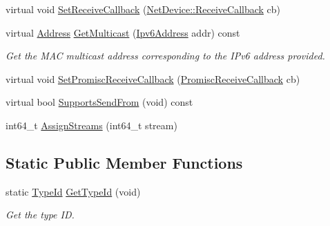 \begin{DoxyCompactItemize}
\item 
virtual void \hyperlink{classns3_1_1CsmaNetDevice_a7aece222e096a5526a28e7bf71e609f8}{Set\+Receive\+Callback} (\hyperlink{classns3_1_1NetDevice_ad5e5e1ca187472bc2ba99575d8def568}{Net\+Device\+::\+Receive\+Callback} cb)
\item 
virtual \hyperlink{classns3_1_1Address}{Address} \hyperlink{classns3_1_1CsmaNetDevice_ac3944d8c8399743a25b9919512912f62}{Get\+Multicast} (\hyperlink{classns3_1_1Ipv6Address}{Ipv6\+Address} addr) const 
\begin{DoxyCompactList}\small\item\em Get the M\+AC multicast address corresponding to the I\+Pv6 address provided. \end{DoxyCompactList}\item 
virtual void \hyperlink{classns3_1_1CsmaNetDevice_a826a66d3c380a4b2190d1a6b1fb5a6e2}{Set\+Promisc\+Receive\+Callback} (\hyperlink{classns3_1_1NetDevice_a427225795919f26c414bee2ea3f31ed2}{Promisc\+Receive\+Callback} cb)
\item 
virtual bool \hyperlink{classns3_1_1CsmaNetDevice_ad660af503a5fb898d8f07507159c82d3}{Supports\+Send\+From} (void) const 
\item 
int64\+\_\+t \hyperlink{classns3_1_1CsmaNetDevice_a7eecd9876d8d0642fc403867e5fa1cb4}{Assign\+Streams} (int64\+\_\+t stream)
\end{DoxyCompactItemize}
\subsection*{Static Public Member Functions}
\begin{DoxyCompactItemize}
\item 
static \hyperlink{classns3_1_1TypeId}{Type\+Id} \hyperlink{classns3_1_1CsmaNetDevice_aee49acd8c695a21662f2111c7771e92b}{Get\+Type\+Id} (void)
\begin{DoxyCompactList}\small\item\em Get the type ID. \end{DoxyCompactList}\end{DoxyCompactItemize}
